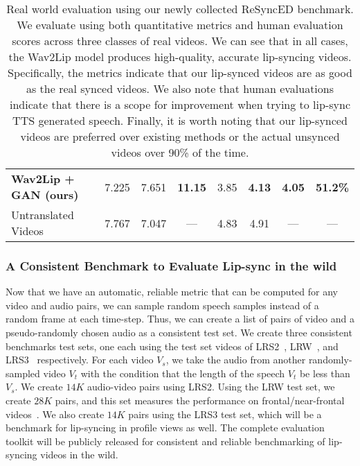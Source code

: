 \documentclass[sigconf]{acmart}
\begin{document}
\begin{table*}[ht]
\begin{tabular}{|l|c|c|c|c||c|c|c|c|}
    \textbf{Wav2Lip + GAN (ours)} & & 7.225 & 7.651 & \textbf{11.15} & 3.85 & \textbf{4.13} & \textbf{4.05} & \textbf{51.2\%}\\
    Untranslated Videos & & 7.767 & 7.047 & --- & 4.83 & 4.91 & --- & --- \\
    \hline
    \end{tabular}
    \caption{Real world evaluation using our newly collected ReSyncED benchmark. We evaluate using both quantitative metrics and human evaluation scores across three classes of real videos. We can see that in all cases, the Wav2Lip model produces high-quality, accurate lip-syncing videos. Specifically, the metrics indicate that our lip-synced videos are as good as the real synced videos. We also note that human evaluations indicate that there is a scope for improvement when trying to lip-sync TTS generated speech. Finally, it is worth noting that our lip-synced videos are preferred over existing methods or the actual unsynced videos over 90\% of the time.}
    \vspace{-0.7cm}
    \label{tab:realvids}
\end{table*}

\subsubsection{A Consistent Benchmark to Evaluate Lip-sync in the wild}
\label{subsec:consistent}
Now that we have an automatic, reliable metric that can be computed for any video and audio pairs, we can sample random speech samples instead of a random frame at each time-step. Thus, we can create a list of pairs of video and a pseudo-randomly chosen audio as a consistent test set. We create three consistent benchmarks test sets, one each using the test set videos of LRS2~\cite{Afouras18c}, LRW~\cite{chung2016lip}, and LRS3~\cite{afouras2018lrs3} respectively. For each video $V_s$, we take the audio from another randomly-sampled video $V_t$ with the condition that the length of the speech $V_t$ be less than $V_s$. We create $14K$ audio-video pairs using LRS2. Using the LRW test set, we create $28K$ pairs, and this set measures the performance on frontal/near-frontal videos~\cite{Afouras18}. We also create $14K$ pairs using the LRS3 test set, which will be a benchmark for lip-syncing in profile views as well. The complete evaluation toolkit will be publicly released for consistent and reliable benchmarking of lip-syncing videos in the wild. 
\end{document}
